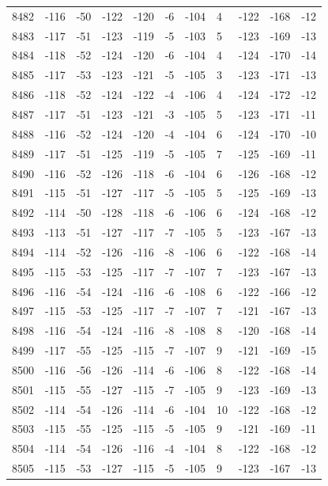 \begin{table}[H]
\begin{tabular}{lllllllllll}
8482 & -116 & -50 & -122 & -120 & -6 & -104 & 4 & -122 & -168 & -12 \\
8483 & -117 & -51 & -123 & -119 & -5 & -103 & 5 & -123 & -169 & -13 \\
8484 & -118 & -52 & -124 & -120 & -6 & -104 & 4 & -124 & -170 & -14 \\
8485 & -117 & -53 & -123 & -121 & -5 & -105 & 3 & -123 & -171 & -13 \\
8486 & -118 & -52 & -124 & -122 & -4 & -106 & 4 & -124 & -172 & -12 \\
8487 & -117 & -51 & -123 & -121 & -3 & -105 & 5 & -123 & -171 & -11 \\
8488 & -116 & -52 & -124 & -120 & -4 & -104 & 6 & -124 & -170 & -10 \\
8489 & -117 & -51 & -125 & -119 & -5 & -105 & 7 & -125 & -169 & -11 \\
8490 & -116 & -52 & -126 & -118 & -6 & -104 & 6 & -126 & -168 & -12 \\
8491 & -115 & -51 & -127 & -117 & -5 & -105 & 5 & -125 & -169 & -13 \\
8492 & -114 & -50 & -128 & -118 & -6 & -106 & 6 & -124 & -168 & -12 \\
8493 & -113 & -51 & -127 & -117 & -7 & -105 & 5 & -123 & -167 & -13 \\
8494 & -114 & -52 & -126 & -116 & -8 & -106 & 6 & -122 & -168 & -14 \\
8495 & -115 & -53 & -125 & -117 & -7 & -107 & 7 & -123 & -167 & -13 \\
8496 & -116 & -54 & -124 & -116 & -6 & -108 & 6 & -122 & -166 & -12 \\
8497 & -115 & -53 & -125 & -117 & -7 & -107 & 7 & -121 & -167 & -13 \\
8498 & -116 & -54 & -124 & -116 & -8 & -108 & 8 & -120 & -168 & -14 \\
8499 & -117 & -55 & -125 & -115 & -7 & -107 & 9 & -121 & -169 & -15 \\
8500 & -116 & -56 & -126 & -114 & -6 & -106 & 8 & -122 & -168 & -14 \\
8501 & -115 & -55 & -127 & -115 & -7 & -105 & 9 & -123 & -169 & -13 \\
8502 & -114 & -54 & -126 & -114 & -6 & -104 & 10 & -122 & -168 & -12 \\
8503 & -115 & -55 & -125 & -115 & -5 & -105 & 9 & -121 & -169 & -11 \\
8504 & -114 & -54 & -126 & -116 & -4 & -104 & 8 & -122 & -168 & -12 \\
8505 & -115 & -53 & -127 & -115 & -5 & -105 & 9 & -123 & -167 & -13 \\

\end{tabular}
\end{table}
